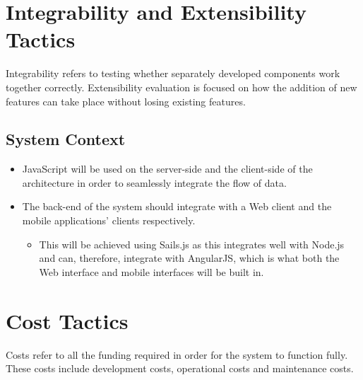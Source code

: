 \documentclass[11pt,fleqn]{book} %
\begin{document}
	\section{Integrability and Extensibility Tactics}
	Integrability refers to testing whether separately developed components work together correctly. Extensibility evaluation is focused on how the addition of new features can take place without losing existing features.
	\subsection{System Context}
	\begin{itemize}
		\item JavaScript will be used on the server-side and the client-side of the architecture in order to seamlessly integrate the flow of data.
		\item The back-end of the system should integrate with a Web client and the mobile applications’ clients respectively.
		\begin{itemize}
			\item This will be achieved using Sails.js as this integrates well with Node.js and can, therefore, integrate with AngularJS, which is what both the Web interface and mobile interfaces will be built in.
		\end{itemize}
		
	\end{itemize}
	
	\section{Cost Tactics}
	Costs refer to all the funding required in order for the system to function fully. These costs include development costs, operational costs and maintenance costs.
\end{document}
